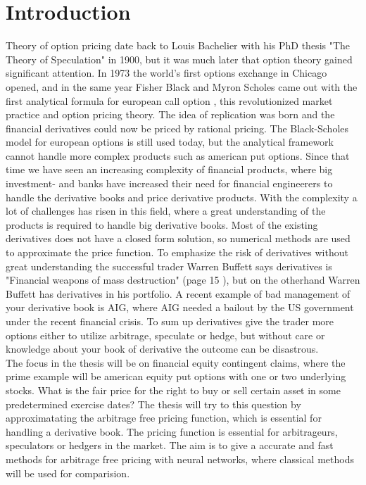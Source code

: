 
\chapter{Introduction} %

\label{Chapter1} %

Theory of option pricing date back to Louis Bachelier with his PhD thesis "The Theory of Speculation" in 1900, but it was much later that option theory gained significant attention. In 1973 the world's first options exchange in Chicago opened, and in the same year Fisher Black and Myron Scholes came out with the first analytical formula for european call option \parencite{B-S-Paper}, this revolutionized market practice and option pricing theory. The idea of replication was born and the financial derivatives could now be priced by rational pricing. The Black-Scholes model for european options is still used today, but the analytical framework cannot handle more complex products such as american put options. Since that time we have seen an increasing complexity of financial products, where big investment- and banks have increased their need for financial engineerers to handle the derivative books and price derivative products. With the complexity a lot of challenges has risen in this field, where a great understanding of the products is required to handle big derivative books. Most of the existing derivatives does not have a closed form solution, so numerical methods are used to approximate the price function. To emphasize the risk of derivatives without great understanding the successful trader Warren Buffett says derivatives is "Financial weapons of mass destruction" (page 15 \parencite{Buffett02}), but on the otherhand Warren Buffett has derivatives in his portfolio. A recent example of bad management of your derivative book is AIG, where AIG needed a bailout by the US government under the recent financial crisis. To sum up derivatives give the trader more options either to utilize arbitrage, speculate or hedge, but without care or knowledge about your book of derivative the outcome can be disastrous.\\

The focus in the thesis will be on financial equity contingent claims, where the prime example will be american equity put options with one or two underlying stocks. What is the fair price for the right to buy or sell certain asset in some predetermined exercise dates? The thesis will try to this question by approximatating the arbitrage free pricing function, which is essential for handling a derivative book. The pricing function is essential for arbitrageurs, speculators or hedgers in the market. The aim is to give a accurate and fast methods for arbitrage free pricing with neural networks, where classical methods will be used for comparision. \\

